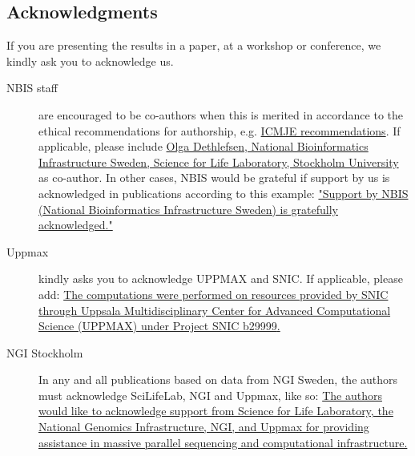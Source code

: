 \documentclass[12pt]{article}
\newcommand{\staff}{Olga Dethlefsen}
\newcommand{\staffWeb}{http://nbis.se/about/staff/olga-dethlefsen/}
\newcommand{\affilations}{National Bioinformatics Infrastructure Sweden, Science for Life Laboratory, Stockholm University}
\newcommand{\uppmaxWeb}{http://www.uppmax.uu.se/support/faq/general-miscellaneous-faq/acknowledging-uppmax--snic--and-uppnex/}
\newcommand{\noUppmax}{b29999}
\begin{document}
\subsection{Acknowledgments}
\label{acknowledgments}
If you are presenting the results in a paper, at a workshop or conference, we kindly ask you to acknowledge us.
\begin{description}
\item[NBIS staff] are encouraged to be co-authors when this is merited in accordance to the ethical recommendations for authorship, e.g. {\href{http://www.icmje.org/recommendations/browse/roles-and-responsibilities/defining-the-role-of-authors-and-contributors.html}{ICMJE recommendations}}. If applicable, please include {\href{\staffWeb}{{\staff}, \affilations}} as co-author. In other cases, NBIS would be grateful if support by us is acknowledged in publications according to this example: \href{https://bils.se/resources/support.html}{"Support by NBIS (National Bioinformatics Infrastructure Sweden) is gratefully acknowledged."}
\item[Uppmax] kindly asks you to acknowledge UPPMAX and SNIC. If applicable, please add: {\href{\uppmaxWeb}{The computations were performed on resources provided by SNIC through Uppsala Multidisciplinary Center for Advanced Computational Science (UPPMAX) under Project SNIC {\noUppmax}.}}


\item[NGI Stockholm] In any and all publications based on data from NGI Sweden, the authors must acknowledge SciLifeLab, NGI and Uppmax, like so: \href{https://ngisweden.scilifelab.se/info/faq#how-do-i-acknowledge-ngi-in-my-publication}{The authors would like to acknowledge support from Science for Life Laboratory, the National Genomics Infrastructure, NGI, and Uppmax for providing assistance in massive parallel sequencing and computational infrastructure.}
\end{description}

\end{document}
